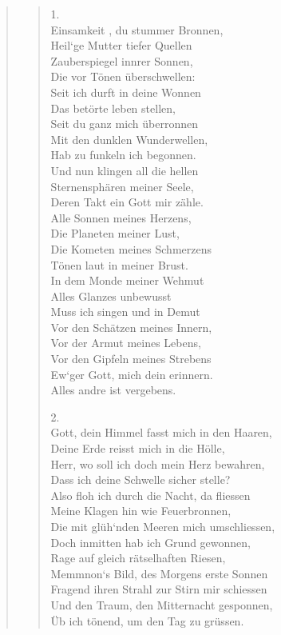 \documentclass[10pt,titlepage,a5paper]{book}
\newenvironment{tg}{\begin{quote}\em}{\end{quote}}
\begin{document}
\begin{tg}
\begin{verse}
1.\\
Einsamkeit , du stummer Bronnen,\\
Heil`ge Mutter  tiefer Quellen\\
Zauberspiegel innrer Sonnen, \\
Die vor Tönen überschwellen:\\
Seit ich durft in deine Wonnen\\
Das betörte leben stellen,\\
Seit du ganz mich überronnen\\
Mit den dunklen Wunderwellen,\\
Hab zu funkeln ich begonnen.\\
Und nun klingen all die hellen\\
Sternensphären meiner Seele,\\
Deren Takt ein Gott mir zähle.\\
Alle Sonnen meines Herzens,\\
Die Planeten meiner Lust,\\
Die Kometen meines Schmerzens\\
Tönen laut in meiner Brust.\\
In dem Monde meiner Wehmut\\
Alles Glanzes unbewusst\\
Muss ich singen und in Demut\\
Vor den Schätzen meines Innern,\\
Vor der Armut meines Lebens,\\
Vor den Gipfeln meines Strebens\\
Ew`ger Gott, mich dein erinnern.\\
Alles andre ist vergebens.

2.\\
Gott, dein Himmel fasst mich in den Haaren,\\
Deine Erde reisst mich in die Hölle,\\
Herr, wo soll ich doch mein Herz bewahren,\\
Dass ich deine Schwelle sicher stelle?\\
Also floh ich durch die Nacht, da fliessen\\
Meine Klagen hin wie Feuerbronnen,\\
Die mit glüh`nden Meeren mich umschliessen,\\
Doch inmitten hab ich Grund gewonnen,\\
Rage auf gleich rätselhaften Riesen,\\
Memmnon`s Bild, des Morgens erste Sonnen\\
Fragend ihren Strahl zur Stirn mir schiessen\\
Und den Traum, den Mitternacht gesponnen,\\
Üb ich tönend, um den Tag zu grüssen.


\end{verse}
\end{tg}
\end{document}
